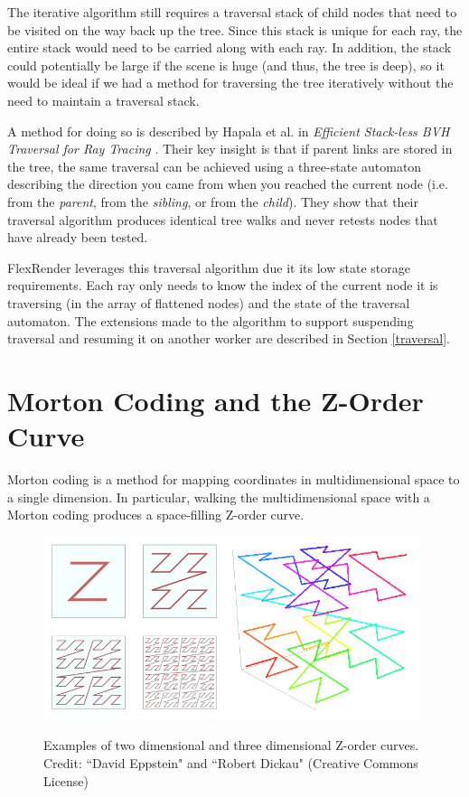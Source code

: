 \documentclass[12pt]{ucthesis}
\newcommand{\captionfonts}{\small\bf\ssp}
\begin{document}
The iterative algorithm still requires a traversal stack of child nodes that
need to be visited on the way back up the tree. Since this stack is unique for
each ray, the entire stack would need to be carried along with each ray. In
addition, the stack could potentially be large if the scene is huge (and thus,
the tree is deep), so it would be ideal if we had a method for traversing the
tree iteratively without the need to maintain a traversal stack.

A method for doing so is described by Hapala et al. in
\emph{Efficient Stack-less BVH Traversal for Ray Tracing} \cite{hapala:2011}.
Their key insight is that if parent links are stored in the tree, the same
traversal can be achieved using a three-state automaton describing the direction
you came from when you reached the current node (i.e. from the \emph{parent},
from the \emph{sibling}, or from the \emph{child}). They show that their
traversal algorithm produces identical tree walks and never retests nodes that
have already been tested.

FlexRender leverages this traversal algorithm due it its low state storage
requirements. Each ray only needs to know the index of the current node it is
traversing (in the array of flattened nodes) and the state of the traversal
automaton. The extensions made to the algorithm to support suspending traversal
and resuming it on another worker are described in Section \ref{traversal}.

\section{Morton Coding and the Z-Order Curve}
\label{morton}

Morton coding is a method for mapping coordinates in multidimensional space to
a single dimension. In particular, walking the multidimensional space with a
Morton coding produces a space-filling Z-order curve.

\begin{figure}[h!]
    \centering
    \includegraphics[width=110mm]{figures/zorder.png}
    \captionfonts
    \caption{Examples of two dimensional and three dimensional Z-order curves. Credit: ``David Eppstein" and ``Robert Dickau" (Creative Commons License)}
    \label{fig:zorder}
\end{figure}
\end{document}
